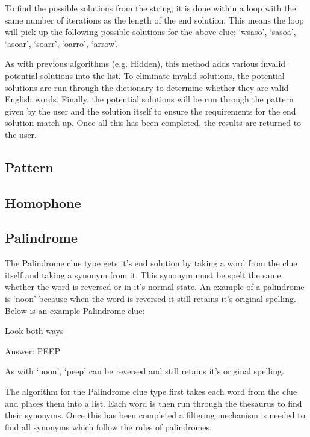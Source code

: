 To find the possible solutions from the string, it is done within a loop with the same number 
of iterations as the length of the end solution. This means the loop will pick up the 
following possible solutions for the above clue; `wsaso', `sasoa', `asoar', 
`soarr', `oarro', `arrow'.

As with previous algorithms (e.g. Hidden), this method adds various 
invalid potential solutions into the list. To eliminate invalid solutions, the 
potential solutions are run through the dictionary to determine whether 
they are valid English words. Finally, the potential solutions will be run through 
the pattern given by the user and the solution itself to ensure the 
requirements for the end solution match up. Once all this has been completed, 
the results are returned to the user. 

\subsection{Pattern}

\subsection{Homophone}

\subsection{Palindrome}

The Palindrome clue type gets it's end solution by taking a word from 
the clue itself and taking a synonym from it. This synonym must be 
spelt the same whether the word is reversed or in it's normal state. 
An example of a palindrome is `noon' because when the word is reversed 
it still retains it's original spelling. Below is an example Palindrome clue:

Look both ways

Answer: PEEP

As with `noon', `peep' can be reversed and still retains it's original spelling. 

The algorithm for the Palindrome clue type first takes each word 
from the clue and places them into a list. Each word is then run through 
the thesaurus to find their synonyms. Once this has been completed a 
filtering mechanism is needed to find all synonyms which follow the 
rules of palindromes. 

